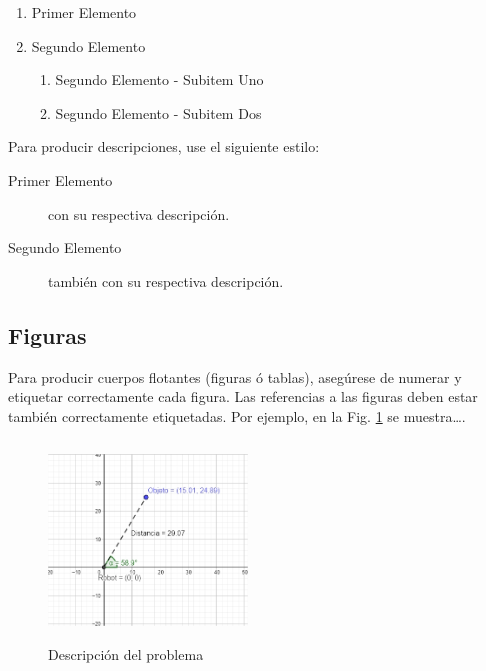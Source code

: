 \documentclass[a4paper,10pt,twocolumn]{article}
\begin{document}
		\begin{enumerate}
			\item Primer Elemento
			\item Segundo Elemento
			\begin {enumerate}
				\item {Segundo Elemento - Subitem Uno}
				\item {Segundo Elemento - Subitem Dos}
			\end {enumerate}
		\end{enumerate}

		Para producir descripciones, use el siguiente estilo:

		\begin{description}
			\item [Primer Elemento] con su respectiva descripción.
			\item [Segundo Elemento] también con su respectiva descripción.
		\end{description}

	\subsection{Figuras}\label{sub:figures}
	

		Para producir cuerpos flotantes (figuras ó tablas), asegúrese de numerar
		y etiquetar correctamente cada figura. Las referencias a las figuras deben
		estar también correctamente etiquetadas. Por ejemplo, en la Fig. \ref{fig:arr}
		se muestra\ldots.

		\begin{figure}[htb]%
		\begin{center}
		\includegraphics[width=200px, height=200px]{images/problem_description.jpg}
		\end{center}
		\caption{Descripción del problema \label{fig:arr}}%
		\end{figure}
\end{document}
